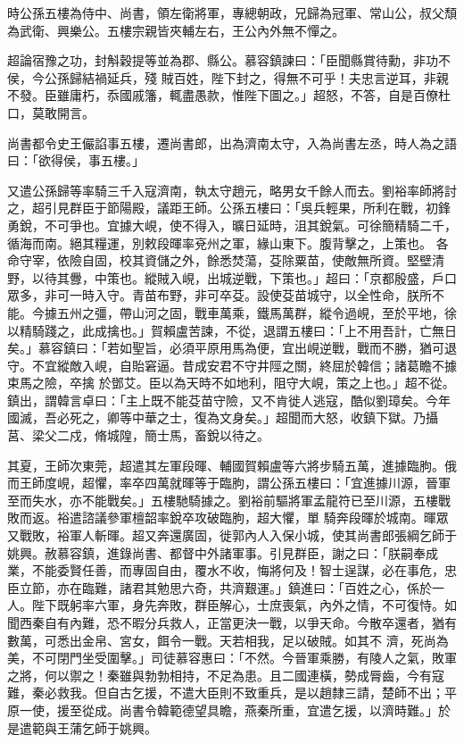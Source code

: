 \begin{pinyinscope}
 時公孫五樓為侍中、尚書，領左衛將軍，專總朝政，兄歸為冠軍、常山公，叔父頹為武衛、興樂公。五樓宗親皆夾輔左右，王公內外無不憚之。



 超論宿豫之功，封斛穀提等並為郡、縣公。慕容鎮諫曰：「臣聞縣賞待勳，非功不侯，今公孫歸結禍延兵，殘
 賊百姓，陛下封之，得無不可乎！夫忠言逆耳，非親不發。臣雖庸朽，忝國戚籓，輒盡愚款，惟陛下圖之。」超怒，不答，自是百僚杜口，莫敢開言。



 尚書都令史王儼諂事五樓，遷尚書郎，出為濟南太守，入為尚書左丞，時人為之語曰：「欲得侯，事五樓。」



 又遣公孫歸等率騎三千入寇濟南，執太守趙元，略男女千餘人而去。劉裕率師將討之，超引見群臣于節陽殿，議距王師。公孫五樓曰：「吳兵輕果，所利在戰，初鋒勇銳，不可爭也。宜據大峴，使不得入，曠日延時，沮其銳氣。可徐簡精騎二千，循海而南。絕其糧運，別敕段暉率兗州之軍，緣山東下。腹背擊之，上策也。
 各命守宰，依險自固，校其資儲之外，餘悉焚蕩，芟除粟苗，使敵無所資。堅壁清野，以待其釁，中策也。縱賊入峴，出城逆戰，下策也。」超曰：「京都殷盛，戶口眾多，非可一時入守。青苗布野，非可卒芟。設使芟苗城守，以全性命，朕所不能。今據五州之彊，帶山河之固，戰車萬乘，鐵馬萬群，縱令過峴，至於平地，徐以精騎踐之，此成擒也。」賀賴盧苦諫，不從，退謂五樓曰：「上不用吾計，亡無日矣。」慕容鎮曰：「若如聖旨，必須平原用馬為便，宜出峴逆戰，戰而不勝，猶可退守。不宜縱敵入峴，自貽窘逼。昔成安君不守井陘之關，終屈於韓信；諸葛瞻不據束馬之險，卒擒
 於鄧艾。臣以為天時不如地利，阻守大峴，策之上也。」超不從。鎮出，謂韓言卓曰：「主上既不能芟苗守險，又不肯徙人逃寇，酷似劉璋矣。今年國滅，吾必死之，卿等中華之士，復為文身矣。」超聞而大怒，收鎮下獄。乃攝莒、梁父二戍，脩城隍，簡士馬，畜銳以待之。



 其夏，王師次東莞，超遣其左軍段暉、輔國賀賴盧等六將步騎五萬，進據臨朐。俄而王師度峴，超懼，率卒四萬就暉等于臨朐，謂公孫五樓曰：「宜進據川源，晉軍至而失水，亦不能戰矣。」五樓馳騎據之。劉裕前驅將軍孟龍符已至川源，五樓戰敗而返。裕遣諮議參軍檀韶率銳卒攻破臨朐，超大懼，單
 騎奔段暉於城南。暉眾又戰敗，裕軍人斬暉。超又奔還廣固，徙郭內人入保小城，使其尚書郎張綱乞師于姚興。赦慕容鎮，進錄尚書、都督中外諸軍事。引見群臣，謝之曰：「朕嗣奉成業，不能委賢任善，而專固自由，覆水不收，悔將何及！智士逞謀，必在事危，忠臣立節，亦在臨難，諸君其勉思六奇，共濟艱運。」鎮進曰：「百姓之心，係於一人。陛下既躬率六軍，身先奔敗，群臣解心，士庶喪氣，內外之情，不可復恃。如聞西秦自有內難，恐不暇分兵救人，正當更決一戰，以爭天命。今散卒還者，猶有數萬，可悉出金帛、宮女，餌令一戰。天若相我，足以破賊。如其不
 濟，死尚為美，不可閉門坐受圍擊。」司徒慕容惠曰：「不然。今晉軍乘勝，有陵人之氣，敗軍之將，何以禦之！秦雖與勃勃相持，不足為患。且二國連橫，勢成脣齒，今有寇難，秦必救我。但自古乞援，不遣大臣則不致重兵，是以趙隸三請，楚師不出；平原一使，援至從成。尚書令韓範德望具瞻，燕秦所重，宜遣乞援，以濟時難。」於是遣範與王蒲乞師于姚興。




\end{pinyinscope}
